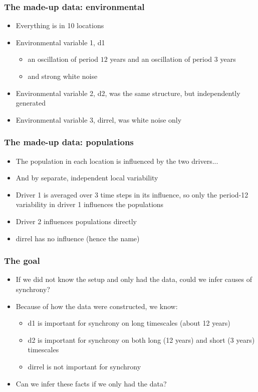 \documentclass{beamer}
\begin{document}
\begin{frame}
\frametitle{The made-up data: environmental}
\begin{itemize}
\item Everything is in 10 locations
\item Environmental variable 1, d1
\begin{itemize}
\item an oscillation of period $12$ years and an oscillation of period $3$ years
\item and strong white noise
\end{itemize}
\item Environmental variable 2, d2, was the same structure, but independently generated
\item Environmental variable 3, dirrel, was white noise only
\end{itemize}
\end{frame}

\begin{frame}
\frametitle{The made-up data: populations}
\begin{itemize}
\item The population in each location is influenced by the two drivers...
\item And by separate, independent local variability
\item Driver 1 is averaged over 3 time steps in its influence, so
only the period-12 variability in driver 1 influences the populations
\item Driver 2 influences populations directly
\item dirrel has no influence (hence the name)
\end{itemize}
\end{frame}

\begin{frame}
\frametitle{The goal}
\begin{itemize}
\item If we did not know the setup and only had the data, could we infer causes of synchrony?
\item Because of how the data were constructed, we know:
\begin{itemize}
\item d1 is important for synchrony on long timescales (about 12 years)
\item d2 is important for synchrony on both long (12 years) and short (3 years) timescales
\item dirrel is not important for synchrony
\end{itemize}
\item Can we infer these facts if we only had the data?
\end{itemize}
\end{frame}
\end{document}
